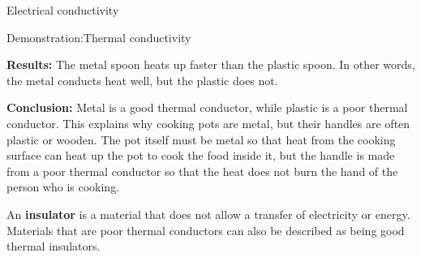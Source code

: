 \begin{iexperiment}{Electrical conductivity}
\begin{gexperiment}{Demonstration:Thermal conductivity}
{\begin{itemize}[noitemsep]
\end{itemize}
        \par 
\label{m38706*eip-270}
	\par
      \label{m38706*id66666}\noindent{}\textbf{Results: }\newline
    The metal spoon heats up faster than the plastic spoon. In other words, the metal conducts heat well, but the plastic does not.\par 
\label{m38706*id66687}\noindent{}\textbf{Conclusion: }Metal is a good thermal conductor, while plastic is a poor thermal conductor. This explains why cooking pots are metal, but their handles are often plastic or wooden. The pot itself must be metal so that heat from the cooking surface can heat up the pot to cook the food inside it, but the handle is made from a poor thermal conductor so that the heat does not burn the hand of the person who is cooking.}
 \par 
      \label{m38706*id66699}An \textbf{insulator} is a material that does not allow a transfer of electricity or energy. Materials that are poor thermal conductors can also be described as being good thermal insulators.\par 

\end{gexperiment}
\end{iexperiment}
